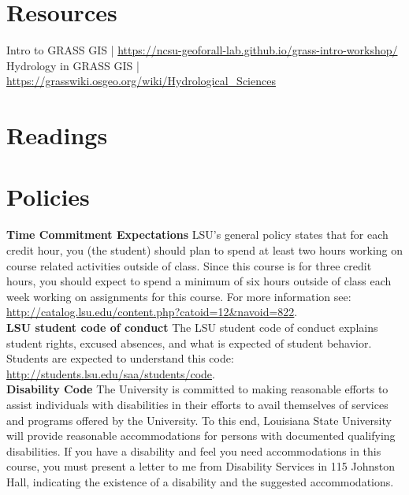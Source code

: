 \documentclass[11pt,article,oneside]{memoir}
\begin{document}
\section{Resources}
Intro to GRASS GIS | \url{https://ncsu-geoforall-lab.github.io/grass-intro-workshop/}\\
Hydrology in GRASS GIS | \url{https://grasswiki.osgeo.org/wiki/Hydrological_Sciences}\\

\clearpage
\section{Readings}
\renewcommand*{\bibfont}{\normalsize} %
\vspace*{0.5cm}
\nocite{*}
\setlength{}
\printbibliography[heading=none]

\clearpage

\section{Policies}

\noindent \textbf{Time Commitment Expectations}
LSU's general policy states that for each credit hour, you (the student) should plan to
spend at least two hours working on course related activities outside of class. Since this course is for three credit hours, you should expect to spend a minimum of six hours outside of class each week working on assignments for this course. For more information see: 
\url{http://catalog.lsu.edu/content.php?catoid=12&navoid=822}.\\

\noindent \textbf{LSU student code of conduct}
The LSU student code of conduct explains student rights, excused absences, and what is expected of student behavior. Students are expected to understand this code:  \url{http://students.lsu.edu/saa/students/code}.\\ %

\noindent \textbf{Disability Code}
The University is committed to making reasonable efforts to assist individuals with disabilities in
their efforts to avail themselves of services and programs offered by the University. To this end,
Louisiana State University will provide reasonable accommodations for persons with
documented qualifying disabilities. If you have a disability and feel you need accommodations in
this course, you must present a letter to me from Disability Services in 115 Johnston Hall,
indicating the existence of a disability and the suggested accommodations.\\
\end{document}
